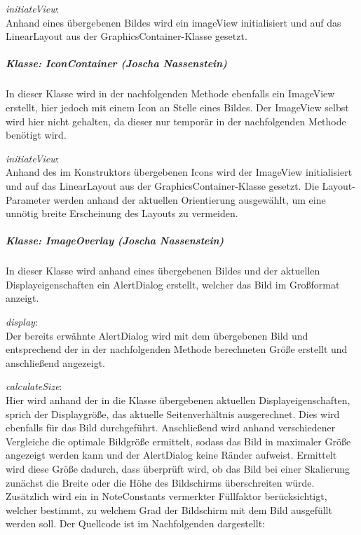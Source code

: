 \textit{initiateView}:\\
Anhand eines übergebenen Bildes wird ein imageView initialisiert und auf das LinearLayout aus der GraphicsContainer-Klasse gesetzt.

\subparagraph*{Klasse: IconContainer (Joscha Nassenstein)}
In dieser Klasse wird in der nachfolgenden Methode ebenfalls ein ImageView erstellt, hier jedoch mit einem Icon an Stelle eines Bildes. Der ImageView selbst wird hier nicht gehalten, da dieser nur temporär in der nachfolgenden Methode benötigt wird.

\textit{initiateView}:\\
Anhand des im Konstruktors übergebenen Icons wird der ImageView initialisiert und auf das LinearLayout aus der GraphicsContainer-Klasse gesetzt. Die Layout-Parameter werden anhand der aktuellen Orientierung ausgewählt, um eine unnötig breite Erscheinung des Layouts zu vermeiden.

\subparagraph*{Klasse: ImageOverlay (Joscha Nassenstein)}
In dieser Klasse wird anhand eines übergebenen Bildes und der aktuellen Displayeigenschaften ein AlertDialog erstellt, welcher das Bild im Großformat anzeigt.

\textit{display}:\\
Der bereits erwähnte AlertDialog wird mit dem übergebenen Bild und entsprechend der in der nachfolgenden Methode berechneten Größe erstellt und anschließend angezeigt.

\textit{calculateSize}:\\
Hier wird anhand der in die Klasse übergebenen aktuellen Displayeigenschaften, sprich der Displaygröße, das aktuelle Seitenverhältnis ausgerechnet. Dies wird ebenfalls für das Bild durchgeführt. Anschließend wird anhand verschiedener Vergleiche die optimale Bildgröße ermittelt, sodass das Bild in maximaler Größe angezeigt werden kann und der AlertDialog keine Ränder aufweist. Ermittelt wird diese Größe dadurch, dass überprüft wird, ob das Bild bei einer Skalierung zunächst die Breite oder die Höhe des Bildschirms überschreiten würde. Zusätzlich wird ein in NoteConstants vermerkter Füllfaktor berücksichtigt, welcher bestimmt, zu welchem Grad der Bildschirm mit dem Bild ausgefüllt werden soll.
Der Quellcode ist im Nachfolgenden dargestellt: 


